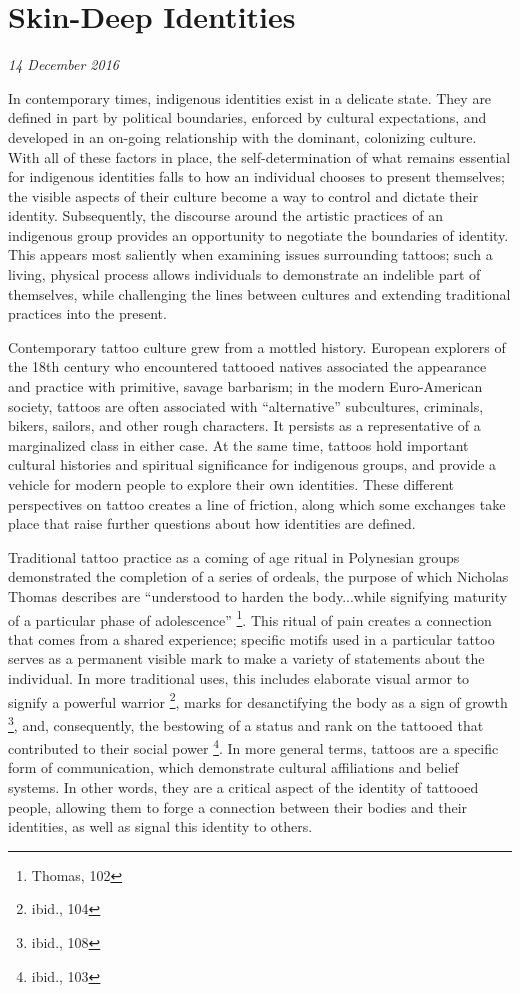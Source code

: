 \section{Skin-Deep Identities}

\textit{14 December 2016}

In contemporary times, indigenous identities exist in a delicate state.
They are defined in part by political boundaries, enforced by cultural
expectations, and developed in an on-going relationship with the dominant,
colonizing culture. With all of these factors in place, the self-determination
of what remains essential for indigenous identities falls to how an individual
chooses to present themselves; the visible aspects of their culture become a way
to control and dictate their identity. Subsequently, the discourse around
the artistic practices of an indigenous group provides an
opportunity to negotiate the boundaries of identity. This appears most
saliently when examining issues surrounding tattoos; such a living, physical
process allows individuals to demonstrate an indelible part of themselves, while
challenging the lines between cultures and extending traditional practices into
the present.

Contemporary tattoo culture grew from a mottled history. European explorers of the
18th century who encountered tattooed natives associated the appearance and
practice with primitive, savage barbarism; in the modern
Euro-American society, tattoos are often associated with ``alternative''
subcultures, criminals, bikers, sailors, and other rough characters. It persists
as a representative of a marginalized class in either case. At the same time,
tattoos hold important cultural histories and spiritual significance for
indigenous groups, and provide a vehicle for modern people to explore their own
identities. These different perspectives on tattoo creates a line of friction,
along which some exchanges take place that raise further questions about how
identities are defined.

Traditional tattoo practice as a coming of age ritual in Polynesian groups
demonstrated the
completion of a series of ordeals, the purpose of which Nicholas Thomas
describes are ``understood to harden the body...while signifying maturity of a
particular phase of adolescence'' \footnote{Thomas, 102}. This ritual of
pain creates a connection that comes from a shared experience; specific motifs
used in a particular tattoo serves as a permanent visible mark to make a variety
of statements about the individual. In more traditional uses, this includes
elaborate visual armor to signify a powerful warrior \footnote{ibid., 104},
marks for desanctifying the body as a sign of growth \footnote{ibid., 108}, and,
consequently, the bestowing of a status and rank on the tattooed that
contributed to their social power \footnote{ibid., 103}. In more general terms,
tattoos are a specific form of communication, which demonstrate cultural
affiliations and belief systems. In other words, they are a critical aspect of
the identity of tattooed people, allowing them to forge a connection
between their bodies and their identities, as well as signal this identity to
others.

